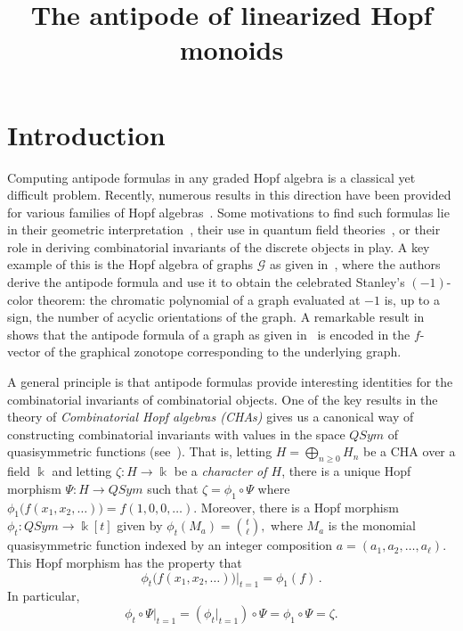 \documentclass[ALCO,ThmDefs,Unicode,epreuves]{cedram}
\author{\firstname{Carolina} \lastname{Benedetti}} %
\author{\firstname{Nantel} \lastname{Bergeron}} %
\title[Antipode of linearized Hopf monoids]{The antipode of linearized Hopf monoids}
\def\field{\Bbbk}
\begin{document}
\maketitle

\section*{Introduction}



Computing antipode formulas in any graded Hopf algebra is a classical yet difficult problem. Recently, numerous results in this direction have been provided for various families of Hopf algebras~\cite{Aguiar-Ardila,AM:2010,BakerJarvisBergeronThiem,Benedetti-Sagan, Bergeron-Ceballos, Darij-Reiner,Humpert-Martin}. Some motivations to find such formulas lie in their geometric interpretation~\cite{Aguiar-Ardila}, their use in quantum field theories~\cite{FGB2005}, or their role in deriving combinatorial invariants of the discrete objects in play. 
A key example of this is the Hopf algebra of graphs $\mathcal{G}$ as given in~\cite{Humpert-Martin}, where the authors derive the antipode formula and use it to obtain the celebrated Stanley's $(-1)$-color theorem: the chromatic polynomial of a graph evaluated at $-1$ is, up to a sign, the number of acyclic orientations of the graph. A remarkable result in~\cite{Aguiar-Ardila} shows that the antipode formula of a graph as given in~\cite{Humpert-Martin} is encoded in the $f$-vector of the graphical zonotope corresponding to the underlying graph.

A general principle is that antipode formulas provide interesting identities for the combinatorial invariants of combinatorial objects.
One of the key results in the theory of \emph{Combinatorial Hopf algebras (CHAs)} gives us a canonical way of constructing combinatorial invariants with values in the space $QSym$ of quasisymmetric functions (see~\cite{ABS}).
That is, letting $H=\bigoplus_{n\ge 0} H_n$ be a CHA over a field $\field$ and letting $\zeta\colon H\to\field$ be a \emph{character of $H$}, 
there is a unique Hopf morphism $\Psi:H\to QSym$
 such that $\zeta=\phi_1\circ\Psi$ where $\phi_1\big(f(x_1,x_2,\ldots)\big)=f(1,0,0,\ldots)$. Moreover, there is a Hopf
 morphism $\phi_t \colon QSym\to \field[t]$ given by 
 $\phi_t (M_a)=%
 \genfrac{(}{)}{0pt}{1}{t}{\ell},$
 where $M_a$ is the monomial quasisymmetric function indexed by an integer composition $a=(a_1,a_2,\ldots,a_\ell)$.
 This Hopf morphism has the property that 
 $$\phi_t\big(f(x_1,x_2,\ldots)\big) \Big|_{t=1}=\phi_1(f)\,.$$
In particular,
 $$\phi_t\circ\Psi\Big|_{t=1}=\left( \phi_t\big|_{t=1}\right)\circ\Psi=\phi_1\circ\Psi=\zeta.$$
 
\end{document}
